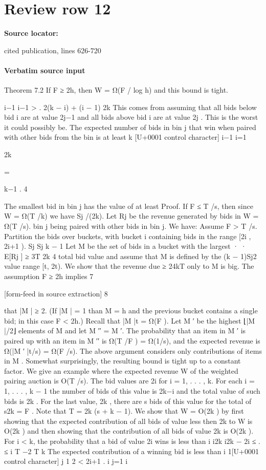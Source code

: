 \documentclass[10pt]{article}
\begin{document}
\section*{Review row 12}
\textbf{Source locator:} {\footnotesize\raggedright cited publication, lines 626-\allowbreak{}720\par}
\paragraph{Verbatim source input}
\begin{ReviewVerbatim}
Theorem 7.2 If F ≥ 2h, then W = Ω(F / log h)
and this bound is tight.

i−1
i−1
>
.
2(k − i) + (i − 1)
2k
This comes from assuming that all bids below bid i
are at value 2j−1 and all bids above bid i are at value
2j . This is the worst it could possibly be. The expected number of bids in bin j that win when paired
with other bids from the bin is at least
k
[U+0001 control character]
i−1
i=1

2k

=

k−1
.
4

The smallest bid in bin j has the value of at least Proof. If F ≤ T /s, then since W = Ω(T /k) we have
Sj /(2k). Let Rj be the revenue generated by bids in W = Ω(T /s).
bin j being paired with other bids in bin j. We have:
Assume F > T /s. Partition the bids over buckets,
with bucket i containing bids in the range [2i , 2i+1 ).
Sj Sj k − 1
Let M be the set of bids in a bucket with the largest
·
·
E[Rj ] ≥
3T 2k
4
total bid value and assume that M is defined by the
(k − 1)Sj2
value range [t, 2t). We show that the revenue due
≥
24kT
only to M is big. The assumption F ≥ 2h implies
7


[form-feed in source extraction]
8

that |M | ≥ 2. (If |M | = 1 than M = {h} and the
previous bucket contains a single bid; in this case
F < 2h.) Recall that |M |t = Ω(F ). Let M ′ be the
highest ⌊|M |/2⌋ elements of M and let M ′′ = M \M ′.
The probability that an item in M ′ is paired up
with an item in M ′′ is Ω(T /F ) = Ω(1/s), and the
expected revenue is Ω(|M ′ |t/s) = Ω(F /s).
The above argument considers only contributions
of items in M . Somewhat surprisingly, the resulting
bound is tight up to a constant factor. We give an example where the expected revenue W of the weighted
pairing auction is O(T /s). The bid values are 2i for
i = 1, . . . , k. For each i = 1, . . . , k − 1 the number
of bids of this value is 2k−i and the total value of
such bids is 2k . For the last value, 2k , there are s
bids of this value for the total of s2k = F . Note that
T = 2k (s + k − 1).
We show that W = O(2k ) by first showing that the
expected contribution of all bids of value less then 2k
to W is O(2k ) and then showing that the contribution
of all bids of value 2k is O(2k ).
For i < k, the probability that a bid of value 2i
wins is less than
i
i2k
i2k − 2i
≤ .
≤
i
T −2
T
k
The expected contribution of a winning bid is less
than
i
1[U+0001 control character] j
1
2 < 2i+1 .
i j=1
i


\end{ReviewVerbatim}
\end{document}
